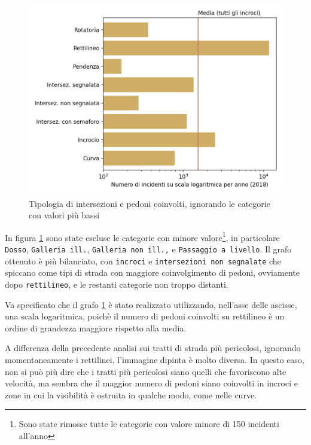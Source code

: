 \documentclass[a4paper,12pt]{report}
\newcommand{\columnstyle}[1]{\texttt{#1}}
\begin{document}
\begin{figure}
    \includegraphics[width=\linewidth]{../src/incidenti/incidenti_senza_coords/pedoni/pedoni_no_rett.png}
    \caption{Tipologia di intersezioni e pedoni coinvolti, ignorando le categorie con valori più bassi}
    \label{fig:pedoni-no-rett}
\end{figure}

In figura \ref{fig:pedoni-no-rett} sono state 
escluse le categorie con minore 
valore\footnote{Sono state rimosse tutte le categorie con valore minore di 
150 incidenti all'anno}, 
in particolare \columnstyle{Dosso}, \columnstyle{Galleria ill.}, 
\columnstyle{Galleria non ill.,} e \columnstyle{Passaggio a livello}.
Il grafo ottenuto è più bilanciato, con \columnstyle{incroci} e 
\columnstyle{intersezioni non segnalate} che spiccano come tipi di strada con 
maggiore coinvolgimento di pedoni, ovviamente dopo \columnstyle{rettilineo}, 
e le restanti categorie non troppo distanti.

Va specificato che il grafo \ref{fig:pedoni-no-rett} è stato realizzato utilizzando, 
nell'asse delle ascisse, una scala logaritmica, poichè il numero di pedoni coinvolti 
su rettilineo è un ordine di grandezza maggiore rispetto alla media.

A differenza della precedente analisi sui tratti di strada più pericolosi, 
ignorando momentaneamente i rettilinei, l'immagine dipinta è molto diversa.
In questo caso, non si può più dire che i tratti più pericolosi siano quelli 
che favoriscono alte velocità, ma sembra che il maggior numero di pedoni 
siano coinvolti in incroci e zone in cui la visibilità è ostruita in 
qualche modo, come nelle curve.
\end{document}
